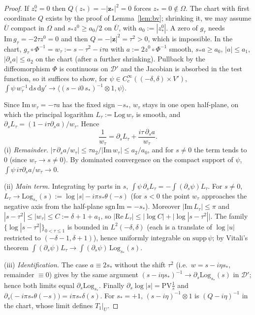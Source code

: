 \documentclass{article}
\theoremstyle{remark}
\begin{document}
\begin{proof}
If $z^0_\ast=0$ then $Q(z_\ast)=-|\mathbf z_\ast|^2=0$ forces $z_\ast=0\notin\Omega$.
The chart with first coordinate $Q$ exists by the proof of Lemma~\ref{lem:bv}; shrinking it, we may assume $\overline U$ compact in $\Omega$ and $s_\ast z^0\ge a_0/2$ on $\overline U$, with $a_0:=|z^0_\ast|$.
A zero of $g_\tau$ needs $\mathrm{Im}\,g_\tau=-2\tau z^0=0$ and then $Q=-|\mathbf z|^2=\tau^2>0$, which is impossible.
In the chart, $g_\tau\circ\Phi^{-1}=w_\tau:=s-\tau^2-i\tau a$ with $a:=2z^0\circ\Phi^{-1}$ smooth, $s_\ast a\ge a_0$, $|a|\le a_1$, $|\partial_sa|\le a_2$ on the chart (after a further shrinking).
Pullback by the diffeomorphism $\Phi$ is continuous on $\mathcal D'$ and the Jacobian is absorbed in the test function, so it suffices to show, for $\psi\in C^\infty_c((-\delta,\delta)\times V')$,
$\int\psi\,w_\tau^{-1}\,\mathrm ds\,\mathrm dy'\to\langle(s-i0\,s_\ast)^{-1}\otimes1,\psi\rangle$.

Since $\mathrm{Im}\,w_\tau=-\tau a$ has the fixed sign $-s_\ast$, $w_\tau$ stays in one open half-plane, on which the principal logarithm $L_\tau:=\mathrm{Log}\,w_\tau$ is smooth, and $\partial_sL_\tau=(1-i\tau\partial_sa)/w_\tau$.
Hence
\[
\frac1{w_\tau}=\partial_sL_\tau+\frac{i\tau\,\partial_sa}{w_\tau}.
\]
(i) \emph{Remainder.} $|\tau\,\partial_sa/w_\tau|\le\tau a_2/|\mathrm{Im}\,w_\tau|\le a_2/a_0$, and for $s\neq0$ the term tends to $0$ (since $w_\tau\to s\ne0$).
By dominated convergence on the compact support of $\psi$, $\int\psi\,i\tau\partial_sa/w_\tau\to0$.

(ii) \emph{Main term.} Integrating by parts in $s$, $\int\psi\,\partial_sL_\tau=-\int(\partial_s\psi)L_\tau$.
For $s\ne0$, $L_\tau\to\mathrm{Log}_{s_\ast}(s):=\log|s|-i\pi s_\ast\theta(-s)$ (for $s<0$ the point $w_\tau$ approaches the negative axis from the half-plane $\mathrm{sgn}\,\mathrm{Im}=-s_\ast$).
Moreover $|\mathrm{Im}\,L_\tau|\le\pi$ and $|s-\tau^2|\le|w_\tau|\le C:=\delta+1+a_1$, so $|\mathrm{Re}\,L_\tau|\le|\log C|+\bigl|\log|s-\tau^2|\bigr|$.
The family $\{\log|s-\tau^2|\}_{0<\tau\le1}$ is bounded in $L^2(-\delta,\delta)$ (each is a translate of $\log|u|$ restricted to $(-\delta-1,\delta+1)$), hence uniformly integrable on $\mathrm{supp}\,\psi$; by Vitali's theorem $\int(\partial_s\psi)L_\tau\to\int(\partial_s\psi)\,\mathrm{Log}_{s_\ast}(s)$.

(iii) \emph{Identification.} The case $a\equiv2s_\ast$ without the shift $\tau^2$ (i.e.\ $w=s-i\eta s_\ast$, remainder $\equiv0$) gives by the same argument $(s-i\eta s_\ast)^{-1}\to\partial_s\mathrm{Log}_{s_\ast}(s)$ in $\mathcal D'$; hence both limits equal $\partial_s\mathrm{Log}_{s_\ast}$.
Finally $\partial_s\log|s|=\mathrm{PV}\frac1s$ and $\partial_s\bigl(-i\pi s_\ast\theta(-s)\bigr)=i\pi s_\ast\delta(s)$.
For $s_\ast=+1$, $(s-i\eta)^{-1}\otimes1$ is $(Q-i\eta)^{-1}$ in the chart, whose limit defines $T_1|_U$.
\end{proof}
\end{document}
